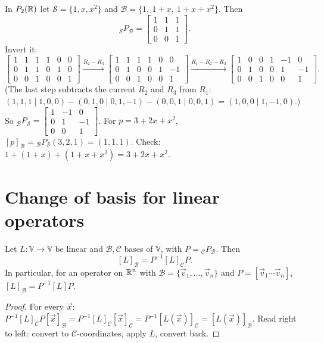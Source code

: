 \begin{example}
In $P_{2}(\mathbb{R})$ let $\mathcal S=\{1,x,x^2\}$ and $\mathcal B=\{1,\ 1+x,\ 1+x+x^2\}$. Then
\[
  {}_{\mathcal S}P_{\mathcal B}=\begin{bmatrix}1&1&1\\0&1&1\\0&0&1\end{bmatrix}.
\]
Invert it:
\[
\left[\begin{array}{ccc|ccc}1&1&1&1&0&0\\0&1&1&0&1&0\\0&0&1&0&0&1\end{array}\right]
\xrightarrow{R_2-R_3}
\left[\begin{array}{ccc|ccc}1&1&1&1&0&0\\0&1&0&0&1&-1\\0&0&1&0&0&1\end{array}\right]
\xrightarrow{R_1-R_2-R_3}
\left[\begin{array}{ccc|ccc}1&0&0&1&-1&0\\0&1&0&0&1&-1\\0&0&1&0&0&1\end{array}\right].
\]
(The last step subtracts the current $R_2$ and $R_3$ from $R_1$: $(1,1,1\mid1,0,0)-(0,1,0\mid0,1,-1)-(0,0,1\mid0,0,1)
=(1,0,0\mid1,-1,0)$.) So ${}_{\mathcal B}P_{\mathcal S}=\begin{bmatrix}1&-1&0\\0&1&-1\\0&0&1\end{bmatrix}$. For
$p=3+2x+x^2$, $[p]_{\mathcal B}={}_{\mathcal B}P_{\mathcal S}(3,2,1)=(1,1,1)$. Check:
$1+(1+x)+(1+x+x^2)=3+2x+x^2$.
\end{example}

\section{Change of basis for linear operators}

\begin{theorem}
Let $L:\mathbb V\to\mathbb V$ be linear and $\mathcal B,\mathcal C$ bases of $\mathbb V$, with $P={}_{\mathcal C}P_{\mathcal B}$. Then
\[
  [L]_{\mathcal B}=P^{-1}[L]_{\mathcal C}P .
\]
In particular, for an operator on $\mathbb{R}^n$ with $\mathcal B=\{\vec v_1,\dots,\vec v_n\}$ and $P=[\vec v_1\cdots\vec v_n]$,
$[L]_{\mathcal B}=P^{-1}[L]P$.
\end{theorem}
\begin{proof}
For every $\vec x$: $P^{-1}[L]_{\mathcal C}P[\vec x]_{\mathcal B}=P^{-1}[L]_{\mathcal C}[\vec x]_{\mathcal C}=P^{-1}[L(\vec x)]_{\mathcal C}
=[L(\vec x)]_{\mathcal B}$. Read right to left: convert to $\mathcal C$-coordinates, apply $L$, convert back.
\end{proof}


